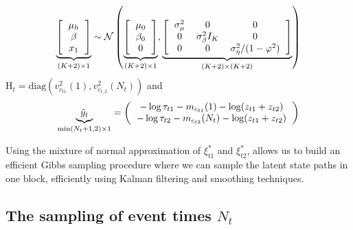 \documentclass[12pt]{article}
\begin{document}
\begin{equation}
\underbrace{\left[ 
\begin{tabular}{c}
$\mu_{h}$ \\
$\beta$ \\
$x_{1}$  
\end{tabular}
\right]}_{(K+2)\times 1} \sim \mathcal{N} \left( \underbrace{\left[ 
\begin{tabular}{c}
$\mu_{0}$ \\
$\beta_{0}$ \\
0
\end{tabular}
\right]}_{(K+2)\times 1} ,\underbrace{\left[ 
\begin{tabular}{ccc}
$\sigma^{2}_{\mu}$ & 0& 0 \\
0&$\sigma^{2}_{\beta} I_{K}$ &  0 \\
0& 0& $\sigma _{\eta}^{2}/(1-\varphi^2)$
\end{tabular}
\right]}_{(K+2)\times (K+2)}  \right)  
\end{equation}
$ \text{H}_t = \text{diag}( v^{2}_{c_{t1}}(1), v^{2}_{c_{t,2}}(N_t))$ and 
\begin{eqnarray}
\underbrace{\tilde{y}_t}_{\min(N_t+1,2)\times 1} = \left(
\begin{tabular}{c}
$- \log \tau_{t1}- m_{ c_{t1}}(1)-\log(z_{t1}+z_{t2})$ \\
$- \log \tau_{t2}- m_{ c_{t2}}(N_t)-\log(z_{t1}+z_{t2})$ 
\end{tabular} \right)
\end{eqnarray}

Using the mixture of normal approximation of $\xi^{*}_{t1}$ and $\xi^{*}_{t2}$, allows us to build an efficient Gibbs sampling procedure where we can sample the latent state paths in one block, efficiently using Kalman filtering and smoothing techniques.


\subsection{The sampling of event times $N_t$}
\end{document}
